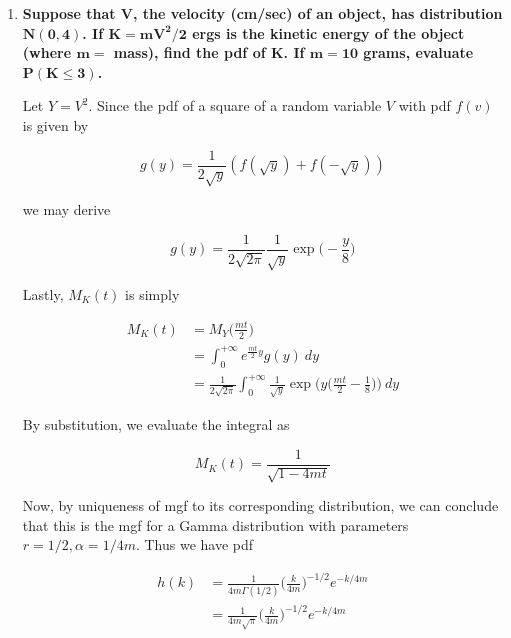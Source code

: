 \documentclass[10pt, oneside]{article}   	%
\theoremstyle{definition}
\begin{document}
\begin{enumerate}[label=10.\arabic*]
\begin{proof}
Deriving the first and second moments yields

\begin{align*}
M'_X(t) &= n(1-2t)^{-n/2 - 1} \\
M'_X(0) &= \boxed{E[X] = n} \\
M''_X(t) &= n(n+2) (1-2t)^{-n/2 - 2} \\
M''_X(0) &= E[X^2] = n(n+2) \\
V[X] = E[X^2] - E[X]^2 &= \boxed{2n}
\end{align*}

\end{proof}

\item  \begin{tcolorbox}[
  colback=Cerulean!5!white,
  colframe=Cerulean!75!black]
\textbf{Suppose that $\bm{V}$, the velocity (cm/sec) of an object, has distribution $\bm{N(0,4)}$. If $\bm{K = mV^2/2}$ ergs is the kinetic energy of the object (where $\bm{m=}$ mass), find the pdf of $\bm{K}$. If $\bm{m=10}$ grams, evaluate $\bm{P(K \leq 3)}$.}
\end{tcolorbox}

Let $Y = V^2$. Since the pdf of a square of a random variable $V$ with pdf $f(v)$ is given by

\[ g(y) = \frac{1}{2\sqrt{y}} (f(\sqrt{y}) + f(-\sqrt{y})) \]

we may derive

\[ g(y) = \frac{1}{2\sqrt{2\pi}} \frac{1}{\sqrt{y}} \exp \bigg( -\frac{y}{8} \bigg) \]

Lastly, $M_K(t)$ is simply

\begin{align*}
M_K(t) &= M_Y \bigg( \frac{mt}{2} \bigg) \\
&= \int^{+\infty}_0 e^{\frac{mt}{2}y} g(y) \ dy \\
&= \frac{1}{2\sqrt{2\pi}} \int^{+\infty}_0 \frac{1}{\sqrt{y}} \exp \bigg( y \bigg( \frac{mt}{2} - \frac{1}{8} \bigg) \bigg) \ dy
\end{align*}

By substitution, we evaluate the integral as 

\[ M_K(t) = \frac{1}{\sqrt{1-4mt}} \]

Now, by uniqueness of mgf to its corresponding distribution, we can conclude that this is the mgf for a Gamma distribution with parameters $r = 1/2, \alpha = 1/4m$. Thus we have pdf

\begin{align*}
h(k) &= \frac{1}{4m \Gamma(1/2)} \bigg( \frac{k}{4m} \bigg)^{-1/2} e^{-k/4m} \\
&= \boxed{ \frac{1}{4m \sqrt{\pi}} \bigg( \frac{k}{4m} \bigg)^{-1/2} e^{-k/4m} }
\end{align*}


\end{enumerate}
\end{document}
